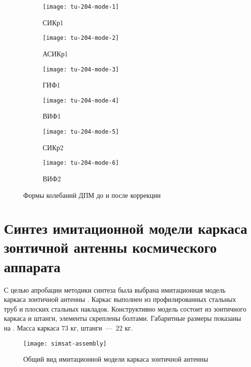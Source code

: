 \begin{figure}[H]
	\centering
	\begin{subfigure}[b]{}
		\centering
		\texttt{[image: tu-204-mode-1]}
		\caption{СИКр1} 
	\end{subfigure}
	\begin{subfigure}[b]{}
		\centering
		\texttt{[image: tu-204-mode-2]}
		\caption{АСИКр1}
	\end{subfigure}
	\begin{subfigure}[b]{}
		\centering
		\texttt{[image: tu-204-mode-3]}
		\caption{ГИФ1}
	\end{subfigure}	
	\begin{subfigure}[b]{}
		\centering
		\texttt{[image: tu-204-mode-4]}
		\caption{ВИФ1}
	\end{subfigure}	
	\begin{subfigure}[b]{}
		\centering
		\texttt{[image: tu-204-mode-5]}
		\caption{СИКр2}
	\end{subfigure}
	\begin{subfigure}[b]{}
		\centering
		\texttt{[image: tu-204-mode-6]}
		\caption{ВИФ2} 
	\end{subfigure}
	\caption{Формы колебаний ДПМ до и после коррекции} \label{fig:tu-204-modes}
\end{figure}

\section{Синтез имитационной модели каркаса зонтичной антенны космического аппарата}

С целью апробации методики синтеза была выбрана имитационная модель каркаса зонтичной антенны  \cite{lib:author:sibnia2019}. Каркас выполнен из профилированных стальных труб и плоских стальных накладок. Конструктивно модель состоит из зонтичного каркаса и штанги, элементы скреплены болтами. Габаритные размеры показаны на . Масса каркаса $ 73 $ кг, штанги~---~$ 22 $ кг.

\begin{figure}[!htb]
	\centerfloat
	\texttt{[image: simsat-assembly]}
	\caption{Общий вид имитационной модели каркаса зонтичной антенны} \label{fig:simsat-assembly}
\end{figure}

